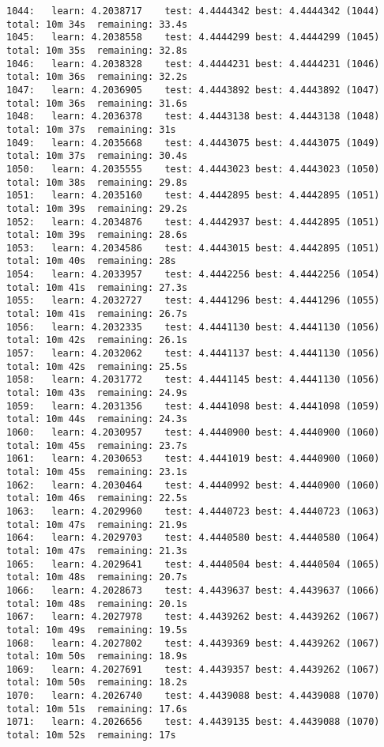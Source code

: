 \documentclass[11pt]{article}
\begin{document}
\begin{Verbatim}[commandchars=\\\{\}]
1044:	learn: 4.2038717	test: 4.4444342	best: 4.4444342 (1044)	total: 10m 34s	remaining: 33.4s
1045:	learn: 4.2038558	test: 4.4444299	best: 4.4444299 (1045)	total: 10m 35s	remaining: 32.8s
1046:	learn: 4.2038328	test: 4.4444231	best: 4.4444231 (1046)	total: 10m 36s	remaining: 32.2s
1047:	learn: 4.2036905	test: 4.4443892	best: 4.4443892 (1047)	total: 10m 36s	remaining: 31.6s
1048:	learn: 4.2036378	test: 4.4443138	best: 4.4443138 (1048)	total: 10m 37s	remaining: 31s
1049:	learn: 4.2035668	test: 4.4443075	best: 4.4443075 (1049)	total: 10m 37s	remaining: 30.4s
1050:	learn: 4.2035555	test: 4.4443023	best: 4.4443023 (1050)	total: 10m 38s	remaining: 29.8s
1051:	learn: 4.2035160	test: 4.4442895	best: 4.4442895 (1051)	total: 10m 39s	remaining: 29.2s
1052:	learn: 4.2034876	test: 4.4442937	best: 4.4442895 (1051)	total: 10m 39s	remaining: 28.6s
1053:	learn: 4.2034586	test: 4.4443015	best: 4.4442895 (1051)	total: 10m 40s	remaining: 28s
1054:	learn: 4.2033957	test: 4.4442256	best: 4.4442256 (1054)	total: 10m 41s	remaining: 27.3s
1055:	learn: 4.2032727	test: 4.4441296	best: 4.4441296 (1055)	total: 10m 41s	remaining: 26.7s
1056:	learn: 4.2032335	test: 4.4441130	best: 4.4441130 (1056)	total: 10m 42s	remaining: 26.1s
1057:	learn: 4.2032062	test: 4.4441137	best: 4.4441130 (1056)	total: 10m 42s	remaining: 25.5s
1058:	learn: 4.2031772	test: 4.4441145	best: 4.4441130 (1056)	total: 10m 43s	remaining: 24.9s
1059:	learn: 4.2031356	test: 4.4441098	best: 4.4441098 (1059)	total: 10m 44s	remaining: 24.3s
1060:	learn: 4.2030957	test: 4.4440900	best: 4.4440900 (1060)	total: 10m 45s	remaining: 23.7s
1061:	learn: 4.2030653	test: 4.4441019	best: 4.4440900 (1060)	total: 10m 45s	remaining: 23.1s
1062:	learn: 4.2030464	test: 4.4440992	best: 4.4440900 (1060)	total: 10m 46s	remaining: 22.5s
1063:	learn: 4.2029960	test: 4.4440723	best: 4.4440723 (1063)	total: 10m 47s	remaining: 21.9s
1064:	learn: 4.2029703	test: 4.4440580	best: 4.4440580 (1064)	total: 10m 47s	remaining: 21.3s
1065:	learn: 4.2029641	test: 4.4440504	best: 4.4440504 (1065)	total: 10m 48s	remaining: 20.7s
1066:	learn: 4.2028673	test: 4.4439637	best: 4.4439637 (1066)	total: 10m 48s	remaining: 20.1s
1067:	learn: 4.2027978	test: 4.4439262	best: 4.4439262 (1067)	total: 10m 49s	remaining: 19.5s
1068:	learn: 4.2027802	test: 4.4439369	best: 4.4439262 (1067)	total: 10m 50s	remaining: 18.9s
1069:	learn: 4.2027691	test: 4.4439357	best: 4.4439262 (1067)	total: 10m 50s	remaining: 18.2s
1070:	learn: 4.2026740	test: 4.4439088	best: 4.4439088 (1070)	total: 10m 51s	remaining: 17.6s
1071:	learn: 4.2026656	test: 4.4439135	best: 4.4439088 (1070)	total: 10m 52s	remaining: 17s

\end{Verbatim}
\end{document}

